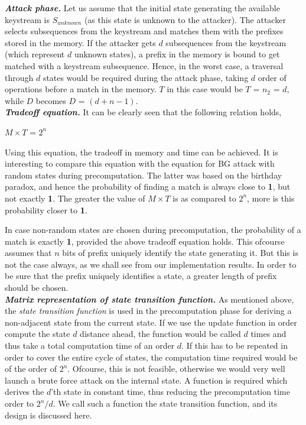 \textit{\textbf{Attack phase.}} Let us assume that the initial state generating the available keystream is $S_{unknown}$ (as this state is unknown to the attacker). The attacker selects subsequences from the keystream and matches them with the prefixes stored in the memory. If the attacker gets $d$ subsequences from the keystream (which represent $d$ unknown states), a prefix in the memory is bound to get matched with a keystream subsequence. Hence, in the worst case, a traversal through $d$ states would be required during the attack phase, taking $d$ order of operations before a match in the memory. $T$ in this case would be $T$ = $n_2$ = $d$, while $D$ becomes $D$ = $(d + n - 1)$.\\

\textit{\textbf{Tradeoff equation.}} It can be clearly seen that the following relation holds,

\begin{center}
\large{$M \times T$ = $2^n$}\\
\end{center}

Using this equation, the tradeoff in memory and time can be achieved. It is interesting to compare this equation with the equation for BG attack with random states during precomputation. The latter was based on the birthday paradox, and hence the probability of finding a match is always close to \textbf{1}, but not exactly \textbf{1}. The greater the value of $M \times T$ is as compared to $2^n$, more is this probability closer to \textbf{1}.

In case non-random states are chosen during precomputation, the probability of a match is exactly \textbf{1}, provided the above tradeoff equation holds. This ofcourse assumes that $n$ bits of prefix uniquely identify the state generating it. But this is not the case always, as we shall see from our implementation results. In order to be sure that the prefix uniquely identifies a state, a greater length of prefix should be chosen.\\

\textit{\textbf{Matrix representation of state transition function.}} As mentioned above, the \emph{state transition function} is used in the precomputation phase for deriving a non-adjacent state from the current state. If we use the update function in order compute the state $d$ distance ahead, the function would be called $d$ times and thus take a total computation time of an order $d$. If this has to be repeated in order to cover the entire cycle of states, the computation time required would be of the order of $2^n$. Ofcourse, this is not feasible, otherwise we would very well launch a brute force attack on the internal state. A function is required which derives the $d$'th state in constant time, thus reducing the precomputation time order to $2^{n}/d$. We call such a function the state transition function, and its design is discussed here. 

